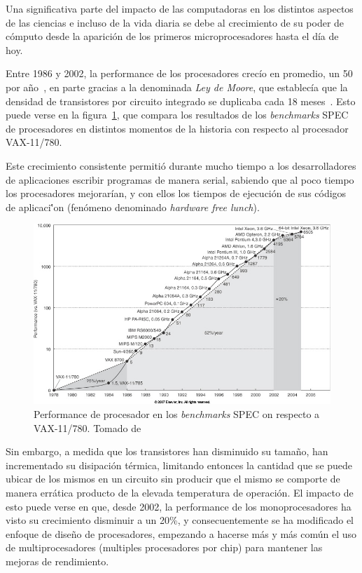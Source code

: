 Una significativa parte del impacto de las computadoras en los distintos aspectos de las
ciencias e incluso de la vida diaria se debe al crecimiento de su
poder de c\'omputo desde la aparici\'on de los primeros microprocesadores hasta el
d\'ia de hoy.

Entre 1986 y 2002, la performance de los procesadores crec\'io en promedio, un 50%
por a\~no~\cite{Pacheco}, en parte gracias a la denominada \textit{Ley de Moore}, que
establec\'ia que la densidad de transistores por circuito integrado se duplicaba
cada 18 meses~\cite{HennessyPatterson}. Esto puede verse en la figura~\ref{processor_performance},
que compara los resultados de los \textit{benchmarks} SPEC de procesadores en distintos
momentos de la historia con respecto al procesador VAX-11/780.

Este crecimiento consistente permiti\'o durante mucho tiempo a los desarrolladores
de aplicaciones escribir programas de manera serial, sabiendo que al poco tiempo los procesadores
mejorar\'ian, y con ellos los tiempos de ejecuci\'on de sus c\'odigos de aplicaci\''on (fen\'omeno denominado
\textit{hardware free lunch}).

\begin{figure}[htbp]
   \centering
   \includegraphics[width=\textwidth]{images/processor-performance.jpg}
   \caption{Performance de procesador en los \textit{benchmarks} SPEC on respecto a VAX-11/780. Tomado de~\cite{HennessyPatterson}}
   \label{processor_performance}
\end{figure}

Sin embargo, a medida que los transistores han disminuido su tama\~no, han incrementado
su disipaci\'on t\'ermica, limitando entonces la cantidad que se puede ubicar de los mismos
en un circuito sin producir que el mismo se comporte de manera err\'atica producto
de la elevada temperatura de operaci\'on. El impacto de esto puede verse en que,
desde 2002, la performance de los monoprocesadores ha visto su crecimiento disminuir
a un 20\%, y consecuentemente se ha modificado el enfoque de dise\~no de procesadores, empezando
a hacerse m\'as y m\'as com\'un el uso de multiprocesadores (multiples procesadores
por chip) para mantener las mejoras de rendimiento.

